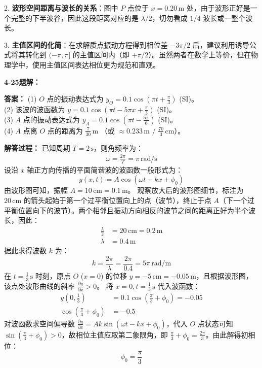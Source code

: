 2. \textbf{波形空间距离与波长的关系}：图中 $P$ 点位于 $x=0.20\,\text{m}$ 处，由于波形正好是一个完整的下半波谷，因此这段距离对应的是 $\lambda/2$，切勿看成 $1/4$ 波长或一整个波长。

3. \textbf{主值区间的化简}：在求解质点振动方程得到相位差 $-3\pi/2$ 后，建议利用诱导公式将其转化到 $(-\pi, \pi]$ 的主值区间内（即 $+\pi/2$）。虽然两者在数学上等价，但在物理学中，使用主值区间表达相位更为规范和直观。

\vspace{2em}

\textbf{4-25题解： }
\setcounter{equation}{0}
\renewcommand{\theHequation}{4-25.\arabic{equation}}

\textbf{答案： }
(1) $O$ 点的振动表达式为 $y_O = 0.1 \cos(\pi t + \frac{\pi}{3})$ (SI)。\\
(2) 该波的波函数为 $y = 0.1 \cos(\pi t - 5\pi x + \frac{\pi}{3})$ (SI)。\\
(3) $A$ 点的振动表达式为 $y_A = 0.1 \cos(\pi t - \frac{5\pi}{6})$ (SI)。\\
(4) $A$ 点离 $O$ 点的距离为 $\frac{7}{30}\,\text{m}$ （或 $\approx 0.233\,\text{m}$ / $\frac{70}{3}\,\text{cm}$）。

\textbf{解答过程： }
已知周期 $T = 2\,\text{s}$，则角频率为：
\begin{align*}
	\omega = \frac{2\pi}{T} = \pi\,\text{rad/s}
\end{align*}
设沿 $x$ 轴正方向传播的平面简谐波的波函数一般形式为：
\begin{equation}\label{eq:4-25-1}
	y(x,t) = A \cos(\omega t - kx + \phi_0)
\end{equation}
由波形图可知，振幅 $A = 10\,\text{cm} = 0.1\,\text{m}$。
观察放大后的波形图细节，标注为 $20\,\text{cm}$ 的箭头起始于第一个过平衡位置向上的点（波节），终止于点 $A$（下一个过平衡位置向下的波节）。两个相邻且振动方向相反的波节之间的距离正好为半个波长，因此：
\begin{align*}
	\frac{\lambda}{2} &= 20\,\text{cm} = 0.2\,\text{m} \\
	\lambda &= 0.4\,\text{m}
\end{align*}
据此求得波数 $k$ 为：
\begin{equation}\label{eq:4-25-2}
	k = \frac{2\pi}{\lambda} = \frac{2\pi}{0.4} = 5\pi\,\text{rad/m}
\end{equation}
在 $t = \frac{1}{3}\,\text{s}$ 时刻，原点 $O$ ($x=0$) 的位移 $y = -5\,\text{cm} = -0.05\,\text{m}$，且根据波形图，该点处波形曲线的斜率 $\frac{\partial y}{\partial x} > 0$。
将 $x=0, t=\frac{1}{3}\,\text{s}$ 代入波函数：
\begin{align*}
	y(0, \frac{1}{3}) &= 0.1 \cos(\frac{\pi}{3} + \phi_0) = -0.05 \\
	\cos(\frac{\pi}{3} + \phi_0) &= -0.5
\end{align*}
对波函数求空间偏导数 $\frac{\partial y}{\partial x} = Ak \sin(\omega t - kx + \phi_0)$，代入 $O$ 点状态可知 $\sin(\frac{\pi}{3} + \phi_0) > 0$，故相位主值应取第二象限角，即 $\frac{\pi}{3} + \phi_0 = \frac{2\pi}{3}$。由此解得初相位：
\begin{equation}\label{eq:4-25-3}
	\phi_0 = \frac{\pi}{3}
\end{equation}

